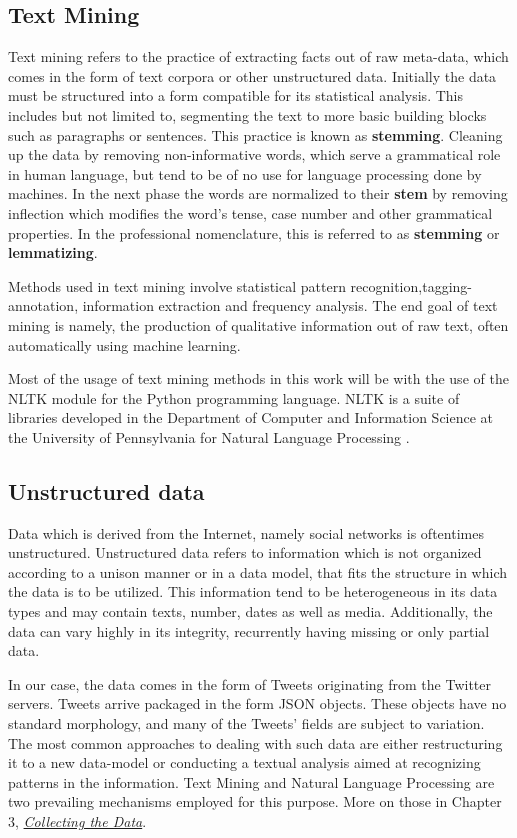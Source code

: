 	\subsection{Text Mining}
		Text mining refers to the practice of extracting facts out of raw meta-data, which comes in the form of text corpora or other unstructured data. Initially the data must be structured into a form compatible for its statistical analysis. This includes but not limited to, segmenting the text to more basic building blocks such as paragraphs or sentences. This practice is known as \textbf{stemming}. Cleaning up the data by removing non-informative words, which serve a grammatical role in human language, but tend to be of no use for language processing done by machines. In the next phase the words are normalized to their \textbf{stem} by removing inflection which modifies the word's tense, case number and other grammatical properties. In the professional nomenclature, this is referred to as \textbf{stemming} or \textbf{lemmatizing}.
		\par
		Methods used in text mining involve statistical pattern recognition,tagging-annotation, information extraction and frequency analysis. The end goal of text mining is namely, the production of qualitative information out of raw text, often automatically using machine learning.
		\par
		Most of the usage of text mining methods in this work will be with the use of the NLTK module for the Python programming language. NLTK is a suite of libraries developed in the Department of Computer and Information Science at the University of Pennsylvania for Natural Language Processing \cite{nltk_book}.

	\subsection{Unstructured data}
		Data which is derived from the Internet, namely social networks is oftentimes unstructured. Unstructured data refers to information which is not organized according to a unison manner or in a data model, that fits the structure in which the data is to be utilized. This information tend to be heterogeneous in its data types and may contain texts, number, dates as well as media. Additionally, the data can vary highly in its integrity, recurrently having missing or only partial data.
		\par
		In our case, the data comes in the form of Tweets originating from the Twitter servers. Tweets arrive packaged in the form JSON objects. These objects have no standard morphology, and many of the Tweets' fields are subject to variation. The most common approaches to dealing with such data are either restructuring it to a new data-model or conducting a textual analysis aimed at recognizing patterns in the information. Text Mining and Natural Language Processing are two prevailing mechanisms employed for this purpose. More on those in Chapter 3, \hyperref[sec:collectdata]{\textit{Collecting the Data}}.
		
